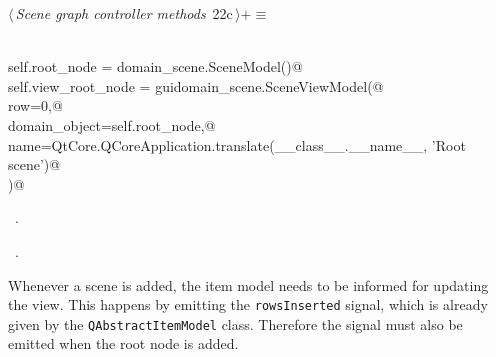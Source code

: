 \documentclass[
    a4paper,      %
    10pt,         %
    openright,    %
    notitlepage,  %
    parskip=half, %
]{scrreprt}       %
\theoremstyle{definition}                    %
\begin{document}
\begin{flushleft} \small
\begin{minipage}{\linewidth}\label{scrap16}\raggedright\small
{} $\langle\,${\itshape Scene graph controller methods}\nobreak\ {\footnotesize {22c}}$\,\rangle+\equiv$
\vspace{-1ex}
\begin{list}{}{} \item
\mbox{}\lstinline@@\\
\mbox{}\lstinline@    self.root_node = domain_scene.SceneModel()@\\
\mbox{}\lstinline@    self.view_root_node = guidomain_scene.SceneViewModel(@\\
\mbox{}\lstinline@        row=0,@\\
\mbox{}\lstinline@        domain_object=self.root_node,@\\
\mbox{}\lstinline@        name=QtCore.QCoreApplication.translate(__class__.__name__, 'Root scene')@\\
\mbox{}\lstinline@    )@\\
\mbox{}\lstinline@@{\NWsep}
\end{list}
\vspace{-1.5ex}
\footnotesize
\begin{list}{}{\setlength{\itemsep}{-\parsep}\setlength{\itemindent}{-\leftmargin}}
\item \NWtxtMacroDefBy\ .
\item \NWtxtMacroRefIn\ .

\item{}
\end{list}
\end{minipage}\vspace{4ex}
\end{flushleft}
Whenever a scene is added, the item model needs to be informed for
updating the view. This happens by emitting the \verb+rowsInserted+ signal,
which is already given by the \verb+QAbstractItemModel+ class. Therefore the
signal must also be emitted when the root node is added.
\end{document}
